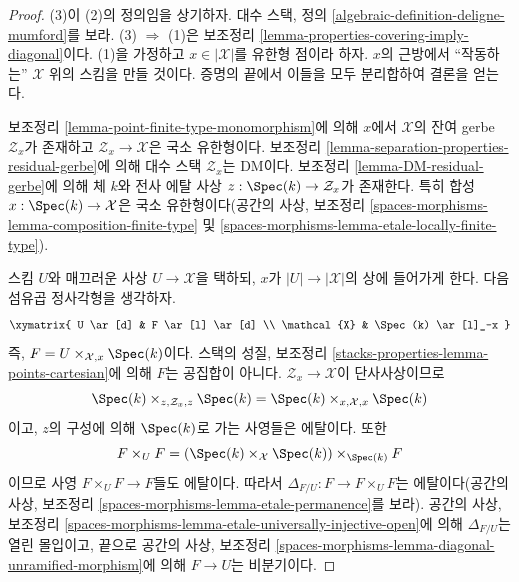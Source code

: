 \begin{proof}
(3)이 (2)의 정의임을 상기하자. 대수 스택, 정의
\ref{algebraic-definition-deligne-mumford}를 보라.
(3) $\Rightarrow$ (1)은 보조정리
\ref{lemma-properties-covering-imply-diagonal}이다. (1)을 가정하고
$x \in |\mathcal{X}|$를 유한형 점이라 하자. $x$의 근방에서
``작동하는'' $\mathcal{X}$ 위의 스킴을 만들 것이다. 증명의 끝에서
이들을 모두 분리합하여 결론을 얻는다.

\medskip\noindent
보조정리 \ref{lemma-point-finite-type-monomorphism}에 의해 $x$에서
$\mathcal{X}$의 잔여 gerbe $\mathcal{Z}_x$가 존재하고
$\mathcal{Z}_x \to \mathcal{X}$은 국소 유한형이다. 보조정리
\ref{lemma-separation-properties-residual-gerbe}에 의해 대수 스택
$\mathcal{Z}_x$는 DM이다. 보조정리 \ref{lemma-DM-residual-gerbe}에 의해
체 $k$와 전사 에탈 사상 $z : \Spec(k) \to \mathcal{Z}_x$가 존재한다.
특히 합성 $x : \Spec(k) \to \mathcal{X}$은 국소 유한형이다(공간의
사상, 보조정리 \ref{spaces-morphisms-lemma-composition-finite-type} 및
\ref{spaces-morphisms-lemma-etale-locally-finite-type}).

\medskip\noindent
스킴 $U$와 매끄러운 사상 $U \to \mathcal{X}$을 택하되, $x$가
$|U| \to |\mathcal{X}|$의 상에 들어가게 한다. 다음 섬유곱 정사각형을
생각하자.
$$
\xymatrix{
U \ar[d] & F  \ar[l] \ar[d] \\
\mathcal{X} & \Spec(k) \ar[l]_-x
}
$$
즉, $F = U \times_{\mathcal{X}, x} \Spec(k)$이다. 스택의 성질,
보조정리 \ref{stacks-properties-lemma-points-cartesian}에 의해 $F$는
공집합이 아니다. $\mathcal{Z}_x \to \mathcal{X}$이 단사사상이므로
$$
\Spec(k) \times_{z, \mathcal{Z}_x, z} \Spec(k)
=
\Spec(k) \times_{x, \mathcal{X}, x} \Spec(k)
$$
이고, $z$의 구성에 의해 $\Spec(k)$로 가는 사영들은 에탈이다. 또한
$$
F \times_U F =
(\Spec(k) \times_\mathcal{X} \Spec(k))
\times_{\Spec(k)} F
$$
이므로 사영 $F \times_U F \to F$들도 에탈이다. 따라서
$\Delta_{F/U} : F \to F \times_U F$는 에탈이다(공간의 사상,
보조정리 \ref{spaces-morphisms-lemma-etale-permanence}를 보라).
공간의 사상, 보조정리
\ref{spaces-morphisms-lemma-etale-universally-injective-open}에 의해
$\Delta_{F/U}$는 열린 몰입이고, 끝으로 공간의 사상, 보조정리
\ref{spaces-morphisms-lemma-diagonal-unramified-morphism}에 의해
$F \to U$는 비분기이다.


\end{proof}
